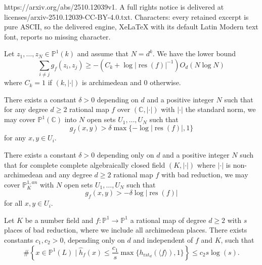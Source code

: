 \documentclass[10pt,a4paper]{amsart}
\newcommand{\bb}{\mathbb}
\newcommand{\berkP}{\mathbb{P}^{1,an}}
\newcommand{\h}{\widehat{h}}
\newcommand{\rat}{\operatorname{rat}}
\newcommand{\res}{\operatorname{res}}
\begin{document}
https://arxiv.org/abs/2510.12039v1. A full rights notice is delivered at licenses/arxiv-2510.12039-CC-BY-4.0.txt. Characters: every retained excerpt is pure ASCII, so the delivered engine, XeLaTeX with its default Latin Modern text font, reports no missing character.
\begin{proposition} \label{ArakelovSumLowerBound1}
Let $z_1,\ldots,z_N \in \bb{P}^1(k)$ and assume that $N = d^k$. We have the lower bound 
$$\sum_{i \not = j} g_f(z_i,z_j) \geq -(C_k + \log |\res(f)|^{-1}) O_d (N \log N)$$
where $C_k = 1$ if $(k, | \cdot |)$ is archimedean and $0$ otherwise.
\end{proposition}

\begin{theorem} \label{UniformBakerLower1}
There exists a constant $\delta > 0$ depending on $d$ and a positive integer $N$ such that for any degree $d \geq 2$ rational map $f$ over $(\bb{C}, | \cdot |)$ with $| \cdot |$ the standard norm, we may cover $\bb{P}^1(\bb{C})$ into $N$ open sets $U_1,\ldots,U_N$ such that 
$$g_{f}(x,y) > \delta \max\{-\log |\res(f)|,1\}$$ 
for any $x,y \in U_i$.  
\end{theorem}

\begin{theorem} \label{UniformBakerLower2}
There exists a constant $\delta > 0$ depending only on $d$ and a positive integer $N$ such that for complete complete algebraically closed field $(K, | \cdot |)$ where $| \cdot |$ is non-archimedean and any degree $d \geq 2$ rational map $f$ with bad reduction, we may cover $\berkP_K$ with $N$ open sets $U_1,\ldots,U_N$ such that 
$$g_f(x,y) > -\delta \log |\res(f)|$$
for all $x,y \in U_i$. 
\end{theorem}

\begin{theorem} \label{UniformBakerTheorem1}
Let $K$ be a number field and $f: \bb{P}^1 \to \bb{P}^1$ a rational map of degree $d \geq 2$ with $s$ places of bad reduction, where we include all archimedean places. There exists constants $c_1,c_2 > 0$, depending only on $d$ and independent of $f$ and $K$, such that 
$$
\# \left\{ x \in \bb{P}^1(L) \mid \h_f(x) \leq \frac{c_1}{s} \max\{h_{\rat_d}(\langle f \rangle) ,1\}\right\} \leq c_2 s \log(s).
$$
\end{theorem}
\end{document}
